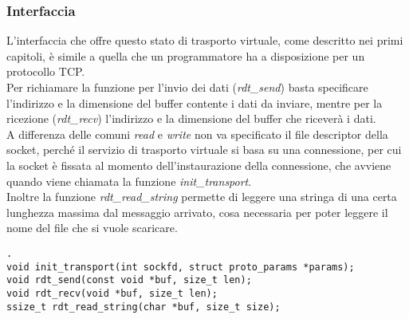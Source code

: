 \subsubsection{Interfaccia}
L'interfaccia che offre questo stato di trasporto virtuale, come descritto nei primi capitoli, è simile a quella che un programmatore ha a disposizione per un protocollo TCP.\\
Per richiamare la funzione per l'invio dei dati (\emph{rdt\_send}) basta specificare l'indirizzo e la dimensione del buffer contente i dati da inviare, mentre per la ricezione (\emph{rdt\_recv}) l'indirizzo e la dimensione del buffer che riceverà i dati.\\
A differenza delle comuni \emph{read} e \emph{write} non va specificato il file descriptor della socket, perché il servizio di trasporto virtuale si basa su una connessione, per cui la socket è fissata al momento dell'instaurazione della connessione, che avviene quando viene chiamata la funzione \emph{init\_transport}.\\
Inoltre la funzione \emph{rdt\_read\_string} permette di leggere una stringa di una certa lunghezza massima dal messaggio arrivato, cosa necessaria per poter leggere il nome del file che si vuole scaricare.

\begin{lstlisting}[title=transport.h].
void init_transport(int sockfd, struct proto_params *params);
void rdt_send(const void *buf, size_t len);
void rdt_recv(void *buf, size_t len);
ssize_t rdt_read_string(char *buf, size_t size);
\end{lstlisting}
